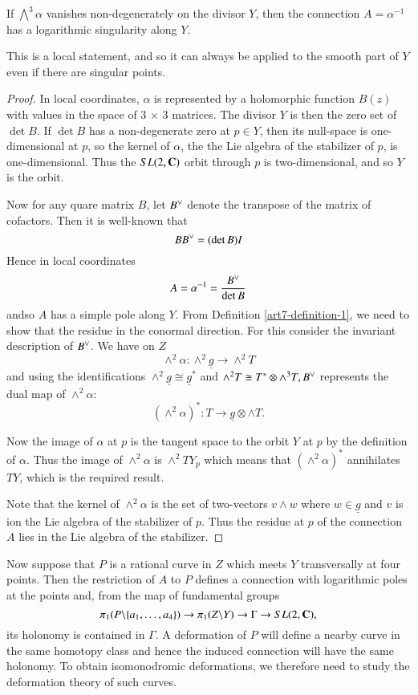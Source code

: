 \begin{proposition}\label{art7-proposition-2}
If $\bigwedge^{3}\alpha$ vanishes non-degenerately on the divisor $Y$, then the connection $A = \alpha^{-1}$ has a logarithmic singularity along $Y$.
\end{proposition}

This is a local statement, and so it can always be applied to the smooth part of $Y$ even if there are singular points.

\begin{proof}
In local coordinates, $\alpha$ is represented by a holomorphic function $B(z)$ with values in the space of 3 $\times$ 3 matrices. The divisor $Y$ is then the zero set of $\det B$. If $\det B$ has a non-degenerate zero at $p \in Y$, then its null-space is one-dimensional at $p$, so the kernel of $\alpha$, the the Lie algebra of the stabilizer of $p$, is one-dimensional. Thus the $SL(2, \mathbf{C})$ orbit through $p$ is two-dimensional, and so $Y$ is the orbit.

Now for any quare matrix $B$, let $B\spcheck$ denote the transpose of the matrix of cofactors. Then it is well-known that
$$
BB\spcheck = (\det B)I
$$
Hence in local coordinates
$$
A = \alpha^{-1} = \dfrac{B\spcheck}{\det B}
$$
and\pageoriginale so $A$ has a simple pole along $Y$. From Definition \ref{art7-definition-1}, we need to show that the residue in the conormal direction. For this consider the invariant description of $B\spcheck$. We have on $Z$
$$
\wedge^{2} \alpha : \wedge^{2}\underline{g} \rightarrow \wedge^{2}T
$$ 
and using the identifications $\wedge^{2}\underline{g} \cong \underline{g}^{*}$ and $\wedge^{2}T \cong T^{*} \otimes \wedge^{3}T, B\spcheck$ represents the dual map of $\wedge^{2}\alpha$:
$$
(\wedge^{2}\alpha)^{*} : T\rightarrow \underline{g} \otimes \wedge T.
$$

Now the image of $\alpha$ at $p$ is the tangent space to the orbit $Y$ at $p$ by the definition of $\alpha$. Thus the image of $\wedge^{2} \alpha$ is $\wedge^{2}TY_{p}$ which means that $ (\wedge^{2}\alpha)^{*}$ annihilates $TY$, which is the required result.

Note that the kernel of $\wedge^{2}\alpha$ is the set of two-vectors $v \wedge w$ where $w \in \underline{g}$ and $v$ is ion the Lie algebra of the stabilizer of $p$. Thus the residue at $p$ of the connection $A$ lies in the Lie algebra of the stabilizer.
\end{proof}

Now suppose that $P$ is a rational curve in $Z$ which meets $Y$ transversally at four points. Then the restriction of $A$ to $P$ defines a connection with logarithmic poles at the points and, from the map of fundamental groups
$$
\pi_{1}(P\backslash \{a_{1},\ldots, a_{4}\})\rightarrow \pi_{1}(Z\backslash Y)\rightarrow \Gamma \rightarrow SL(2, \mathbf{C}),
$$
its holonomy is contained in $\Gamma$. A deformation of $P$ will define a nearby curve in the same homotopy class and hence the induced connection will have the same holonomy. To obtain isomonodromic deformations, we therefore need to study the deformation theory of such curves.

